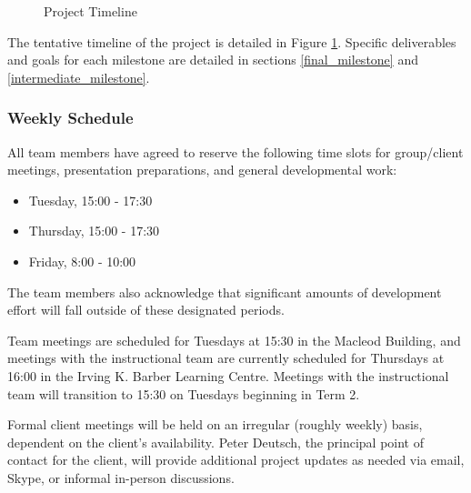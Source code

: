 \begin{figure}[!htb]
\caption{Project Timeline}\label{fig:timeline}
\end{figure}

The tentative timeline of the project is detailed in Figure \ref{fig:timeline}. Specific deliverables and goals for each milestone are detailed in sections \ref{final_milestone} and \ref{intermediate_milestone}.

\subsubsection{Weekly Schedule}

All team members have agreed to reserve the following time slots for group/client meetings, presentation preparations, and general developmental work:
\begin{itemize}
\item Tuesday, 15:00 - 17:30
\item Thursday, 15:00 - 17:30
\item Friday, 8:00 - 10:00
\end{itemize}

The team members also acknowledge that significant amounts of development effort will fall outside of these designated periods.

Team meetings are scheduled for Tuesdays at 15:30 in the Macleod Building, and meetings with the instructional team are currently scheduled for Thursdays at 16:00 in the Irving K. Barber Learning Centre. Meetings with the instructional team will transition to 15:30 on Tuesdays beginning in Term 2.

Formal client meetings will be held on an irregular (roughly weekly) basis, dependent on the client's availability. Peter Deutsch, the principal point of contact for the client, will provide additional project updates as needed via email, Skype, or informal in-person discussions.